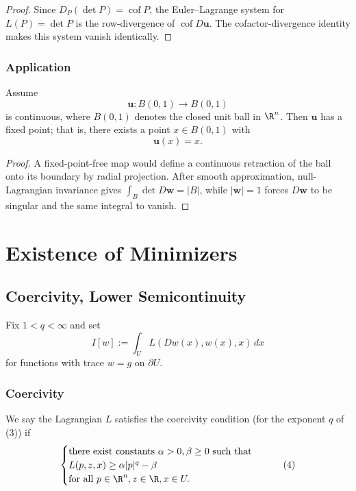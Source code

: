 \begin{proof}
\sketch Since $D_P(\det P)=\operatorname{cof}P$, the Euler--Lagrange system for $L(P)=\det P$ is the row-divergence of $\operatorname{cof}D\mathbf u$. The cofactor-divergence identity makes this system vanish identically.
\end{proof}

\subsubsection{Application}

\begin{theorem}
\label{thm:brouwer-fixed-point-theorem}
Assume
\[
\mathbf{u} : B(0,1) \to B(0,1)
\]
is continuous, where $B(0,1)$ denotes the closed unit ball in $\R^n$. Then $\mathbf{u}$ has a fixed point; that is, there exists a point $x \in B(0,1)$ with
\[
\mathbf{u}(x) = x.
\]
\end{theorem}

\begin{proof}
\sketch A fixed-point-free map would define a continuous retraction of the ball onto its boundary by radial projection. After smooth approximation, null-Lagrangian invariance gives $\int_B\det D\mathbf w=|B|$, while $|\mathbf w|=1$ forces $D\mathbf w$ to be singular and the same integral to vanish.
\end{proof}

\section{Existence of Minimizers}
\label{sec:existence-of-minimizers}

\subsection{Coercivity, Lower Semicontinuity}
\label{sec:coercivity-lower-semicontinuity}

Fix $1<q<\infty$ and set
\[
I[w]:=\int_U L(Dw(x),w(x),x)\,dx
\tag{1}
\]
for functions with trace $w=g$ on $\partial U$.

\subsubsection{Coercivity}

\begin{definition}
\label{def:coercivity-condition-lagrangian}
We say the Lagrangian $L$ satisfies the coercivity condition (for the exponent $q$ of (3)) if
\[
\begin{cases}
\text{there exist constants } \alpha > 0, \beta \geq 0 \text{ such that} \\
L(p, z, x) \geq \alpha|p|^q - \beta \\
\text{for all } p \in \R^n, z \in \R, x \in U.
\end{cases}
\tag{4}
\]
\end{definition}

